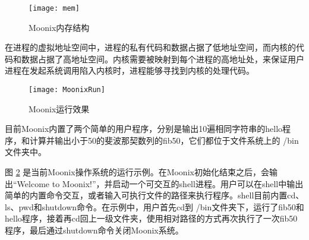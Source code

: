 \begin{figure}[htpb]
	\centering
	\texttt{[image: mem]}
	\setlength{\abovecaptionskip}{2pt}
	\caption{Moonix内存结构}
	\label{pic:moonixmem}
\end{figure}

在进程的虚拟地址空间中，进程的私有代码和数据占据了低地址空间，而内核的代码和数据占据了高地址空间。内核需要被映射到每个进程的高地址处，来保证用户进程在发起系统调用陷入内核时，进程能够寻找到内核的处理代码。

\begin{figure}[htpb]
	\centering
	\texttt{[image: MoonixRun]}
	\caption{Moonix运行效果}
	\label{pic:moonixrun}
\end{figure}

目前Moonix内置了两个简单的用户程序，分别是输出10遍相同字符串的hello程序，和计算并输出小于50的斐波那契数列的fib50，它们都位于文件系统上的 /bin文件夹中。

图 \ref{pic:moonixrun} 是当前Moonix操作系统的运行示例。在Moonix初始化结束之后，会输出“Welcome to Moonix!”，并启动一个可交互的shell进程。用户可以在shell中输出简单的内置命令交互，或者输入可执行文件的路径来执行程序。shell目前内置cd、ls、pwd和shutdown命令。在示例中，用户首先cd到 /bin文件夹下，运行了fib50和hello程序，接着再cd回上一级文件夹，使用相对路径的方式再次执行了一次fib50程序，最后通过shutdown命令关闭Moonix系统。